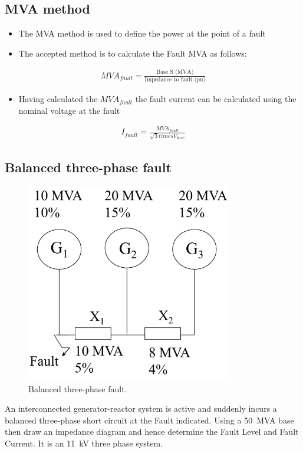 \documentclass[class=report, crop=false, 12pt,a4paper]{standalone}
\begin{document}
\subsection{MVA method}
\begin{itemize}
	\item The MVA method is used to define the power at the point of a fault
	\item The accepted method is to calculate the Fault MVA as follows:
\end{itemize}
\begin{gather}
	MVA_{fault} = \frac{\textrm{Base S (MVA)}}{\textrm{Impedance to fault (pu)}}
\end{gather}
\begin{itemize}
	\item Having calculated the $\si{MVA}_{fault}$ the fault current can be calculated using the nominal voltage at the fault
\end{itemize}
\begin{gather}
	I_{fault} = \frac{\si{MVA}_{fault}}{\sqrt{3}times V_{base}}
\end{gather}
\subsection{Balanced three-phase fault}
\begin{figure}[H]
	\centering
	\includegraphics[width = 0.8\textwidth]{../img/figure17.png}
	\caption{Balanced three-phase fault.}
\end{figure}
An interconnected generator-reactor system is active and suddenly incurs a balanced three-phase short circuit at the Fault indicated. Using a \SI{50}{MVA} base then draw an impedance diagram and hence determine the Fault Level and Fault Current. It is an \SI{11}{kV} three phase system.
\end{document}
